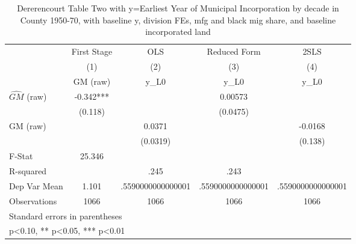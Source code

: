 \begin{table}[htbp]\centering
\def\sym#1{\ifmmode^{#1}\else\(^{#1}\)\fi}
\caption{Dererencourt Table Two with y=Earliest Year of Municipal Incorporation by decade in County 1950-70, with baseline y, division FEs, mfg and black mig share, and baseline incorporated land}
\begin{tabular}{l*{4}{c}}
\toprule
                    & First Stage   &         OLS   &Reduced Form   &        2SLS   \\
                    &\multicolumn{1}{c}{(1)}&\multicolumn{1}{c}{(2)}&\multicolumn{1}{c}{(3)}&\multicolumn{1}{c}{(4)}\\
                    &\multicolumn{1}{c}{GM  (raw)}&\multicolumn{1}{c}{y\_L0}&\multicolumn{1}{c}{y\_L0}&\multicolumn{1}{c}{y\_L0}\\
\midrule
$\hat{GM}$ (raw)    &      -0.342***&               &     0.00573   &               \\
                    &     (0.118)   &               &    (0.0475)   &               \\
\addlinespace
GM  (raw)           &               &      0.0371   &               &     -0.0168   \\
                    &               &    (0.0319)   &               &     (0.138)   \\
\midrule
F-Stat              &      25.346   &               &               &               \\
R-squared           &               &        .245   &        .243   &               \\
Dep Var Mean        &       1.101   &.5590000000000001   &.5590000000000001   &.5590000000000001   \\
Observations        &        1066   &        1066   &        1066   &        1066   \\
\bottomrule
\multicolumn{5}{l}{\footnotesize Standard errors in parentheses}\\
\multicolumn{5}{l}{\footnotesize * p<0.10, ** p<0.05, *** p<0.01}\\
\end{tabular}
\end{table}
